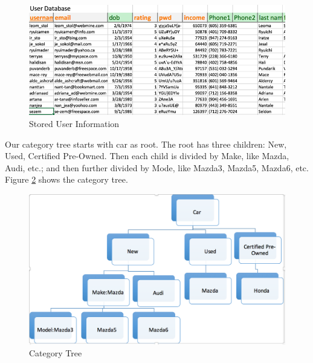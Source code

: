 \documentclass[12pt]{article}
\begin{document}
\begin{figure}[!h]
\caption{Stored User Information} \label{users}
\begin{center}
\includegraphics[width=\textwidth]{users}
\end{center}
\end{figure}
\par Our category tree starts with car as root. The root has three children: New, Used, Certified Pre-Owned. Then each child is divided by Make, like Mazda, Audi, etc.; and then further divided by Mode, like Mazda3, Mazda5, Mazda6, etc. Figure \ref{category_tree} shows the category tree.
\begin{figure}[!h]
\caption{Category Tree} \label{category_tree}
\begin{center}
\includegraphics[width=\textwidth]{category_tree}
\end{center}
\end{figure}
\end{document}
